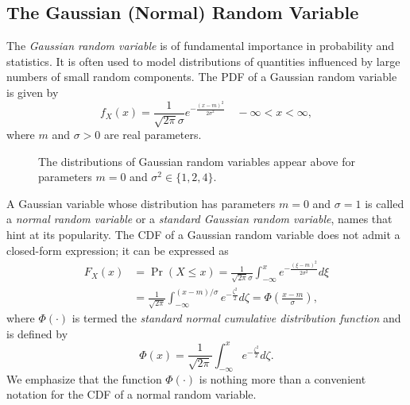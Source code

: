 \subsection{The Gaussian (Normal) Random Variable}

The \emph{Gaussian random variable} is of fundamental importance in probability and statistics. 
It is often used to model distributions of quantities influenced by large numbers of small random components.
The PDF of a Gaussian random variable is given by
\begin{equation*}
f_X (x) = \frac{1}{\sqrt{2 \pi} \sigma} e^{- \frac{(x - m)^2}{2 \sigma^2}}
\quad - \infty < x < \infty,
\end{equation*}
where $m$ and $\sigma > 0$ are real parameters.

\begin{figure}[ht]
\begin{center}
\end{center}
\caption{The distributions of Gaussian random variables appear above for parameters $m = 0$ and $\sigma^2 \in \{ 1, 2, 4 \}$.}
\end{figure}

A Gaussian variable whose distribution has parameters $m = 0$ and $\sigma = 1$ is called a \emph{normal random variable} or a \emph{standard Gaussian random variable}, names that hint at its popularity. 
The CDF of a Gaussian random variable does not admit a closed-form expression; it can be expressed as
\begin{equation*}
\begin{split}
F_X (x) &= \Pr (X \leq x)
= \frac{1}{\sqrt{2 \pi} \sigma}
\int_{- \infty}^{x} e^{- \frac{(\xi - m)^2}{2 \sigma^2}} d\xi \\
&= \frac{1}{\sqrt{2 \pi}}
\int_{- \infty}^{(x - m)/\sigma} e^{- \frac{\zeta^2}{2}} d\zeta
= \Phi \left( \frac{x - m}{\sigma} \right),
\end{split}
\end{equation*}
where $\Phi (\cdot)$ is termed the \emph{standard normal cumulative distribution function} and is defined by
\begin{equation*}
\Phi (x) = 
\frac{1}{\sqrt{2 \pi}} \int_{-\infty}^x e^{-\frac{\zeta^2}{2}} d\zeta .
\end{equation*}
We emphasize that the function $\Phi (\cdot)$ is nothing more than a convenient notation for the CDF of a normal random variable.

